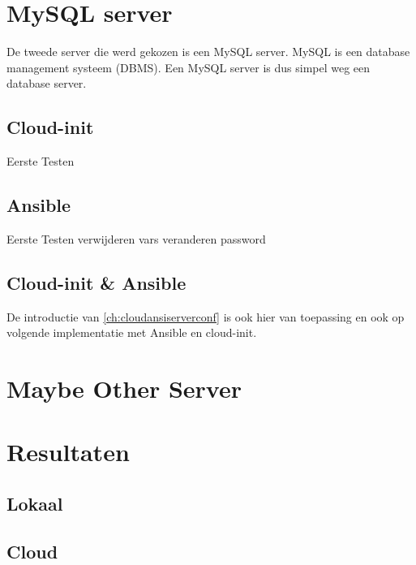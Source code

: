 \section{MySQL server}
De tweede server die werd gekozen is een MySQL server. MySQL is een database management systeem (DBMS). Een MySQL server is dus simpel weg een database server.

\subsection{Cloud-init}
Eerste Testen

\subsection{Ansible}
Eerste Testen
verwijderen vars veranderen password

\subsection{Cloud-init \& Ansible}
De introductie van \ref*{ch:cloudansiserverconf} is ook hier van toepassing en ook op volgende implementatie met Ansible en cloud-init.

\section{Maybe Other Server}

\section{Resultaten}

\subsection{Lokaal}

\subsection{Cloud}
